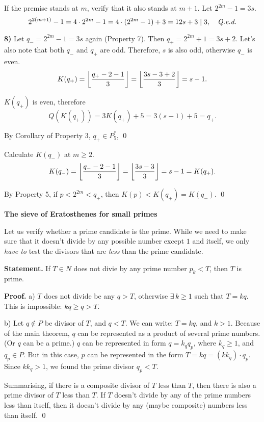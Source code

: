 If the premise stands at $m$, verify that it also stands at $m+1$. Let $2^{2m}-1 = 3s$.
$$
2^{2(m+1)}-1 = 4 \cdot 2^{2m} - 1 = 4 \cdot (2^{2m} - 1) + 3 = 12s+3 \mid 3,
\quad\hbox{\qed}
$$

{\bf 8)\/}
Let $q_- = 2^{2m}-1 = 3s$ again (Property 7). Then $q_+ = 2^{2m}+1 = 3s+2$.
Let's also note that both $q_-$ and $q_+$ are odd. Therefore, $s$ is also odd, otherwise $q_-$ is even.
$$
K(q_+) = \left\lfloor { q_+ - 2 - 1 \over 3} \right\rfloor = \left\lfloor { 3s - 3 + 2 \over 3} \right\rfloor = s - 1.
$$

$K(q_+)$ is even, therefore
$$
Q(K(q_+)) = 3K(q_+) + 5 = 3(s-1)+5 = q_+.
$$

By Corollary of Property 3, $q_+ \in P_5^*$, \qed

Calculate $K(q_-)$ at $m \ge 2$.
$$
K(q_-) = \left\lfloor { q_- - 2 - 1 \over 3} \right\rfloor = \left\lfloor { 3s - 3 \over 3} \right\rfloor = s - 1 = K(q_+).
$$

By Property 5, if $p < 2^{2m} < q_+$, then $K(p) < K(q_+) = K(q_-)$. \qed

\topicskip
{\bf The sieve of Eratosthenes for small primes}
\bigvskip

Let us verify whether a prime candidate is the prime. While we need to make sure that it doesn't divide by
any possible number except $1$ and itself, we only {\it have to\/} test the divisors that are {\it less\/}
than the prime candidate. 

{\bf Statement.\/} If $T \in N$ does not divie by any prime number $p_k < T$, then $T$ is prime.

{\bf Proof.\/} a) $T$ does not divide be any $q>T$, otherwise $\exists \, k \ge 1$ such that $T=kq$.
This is impossible: $kq \ge q > T$.

b) Let $q \notin P$ be divisor of $T$, and $q<T$. We can write: $T = k q$, and $k > 1$.
Because of the main theorem, $q$ can be represented
as a product of several prime numbers. (Or $q$ can be a prime.) $q$ can be represented in form $q = k_q q_p$,
where $k_q \ge 1$, and $q_p \in P$. But in this case, $p$ can be represented in the form
$T = k q = (k k_q) \cdot q_p$. Since $k k_q > 1$, we found the prime divisor $q_p < T$.

Summarising, if there is a composite divisor of $T$ less than $T$, then there is also a prime divisor of $T$
less than $T$. If $T$ doesn't divide by any of the prime numbers less than itself, then it doesn't
divide by any (maybe composite) numbers less than itself. \qed

